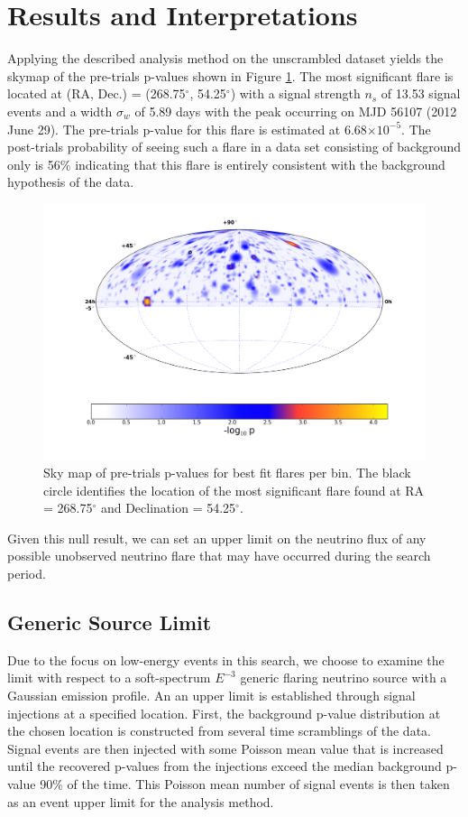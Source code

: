 \documentclass[manuscript]{aastex}
\begin{document}
\section{Results and Interpretations}
Applying the described analysis method on the unscrambled dataset yields the skymap of the pre-trials p-values shown in Figure \ref{fig:RealSkyMap}. The most significant flare is located at (RA, Dec.) = (268.75$^{\circ}$, 54.25$^{\circ}$) with a signal strength $n_s$ of 13.53 signal events and a width $\sigma_w$ of 5.89 days with the peak occurring on MJD 56107 (2012 June 29). The pre-trials p-value for this flare is estimated at 6.68$\times 10^{-5}$. The post-trials probability of seeing such a flare in a data set consisting of background only is 56$\%$ indicating that this flare is entirely consistent with the background hypothesis of the data.
\begin{figure}[ht]
  \begin{center}
    \includegraphics[width=1.0\textwidth,keepaspectratio]{plots/RealResultSkyMap.png}
  \end{center}
  \caption[Results Sky Map]{Sky map of pre-trials p-values for best fit flares per bin. The black circle identifies the location of the most significant flare found at RA = 268.75$^\circ$ and Declination = 54.25$^\circ$.}
  \label{fig:RealSkyMap}
\end{figure}
Given this null result, we can set an upper limit on the neutrino flux of any possible unobserved neutrino flare that may have occurred during the search period. 
\subsection{Generic Source Limit}
Due to the focus on low-energy events in this search, we choose to examine the limit with respect to a soft-spectrum $E^{-3}$ generic flaring neutrino source with a Gaussian emission profile. An an upper limit is established through signal injections at a specified location. First, the background p-value distribution at the chosen location is constructed from several time scramblings of the data. Signal events are then injected with some Poisson mean value that is increased until the recovered p-values from the injections exceed the median background p-value 90$\%$ of the time. This Poisson mean number of signal events is then taken as an event upper limit for the analysis method.
\end{document}
